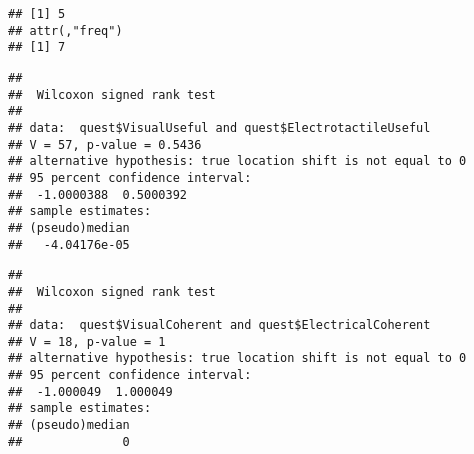\documentclass[
]{article}
\newenvironment{Shaded}{\begin{snugshade}}{\end{snugshade}}
\newcommand{\CommentTok}[1]{\textcolor[rgb]{0.56,0.35,0.01}{\textit{#1}}}
\newcommand{\DataTypeTok}[1]{\textcolor[rgb]{0.13,0.29,0.53}{#1}}
\newcommand{\KeywordTok}[1]{\textcolor[rgb]{0.13,0.29,0.53}{\textbf{#1}}}
\newcommand{\NormalTok}[1]{#1}
\newcommand{\OperatorTok}[1]{\textcolor[rgb]{0.81,0.36,0.00}{\textbf{#1}}}
\newcommand{\OtherTok}[1]{\textcolor[rgb]{0.56,0.35,0.01}{#1}}
\newcommand{\StringTok}[1]{\textcolor[rgb]{0.31,0.60,0.02}{#1}}
\begin{document}
\begin{verbatim}
## [1] 5
## attr(,"freq")
## [1] 7
\end{verbatim}

\begin{Shaded}
\end{Shaded}

\begin{verbatim}
## 
##  Wilcoxon signed rank test
## 
## data:  quest$VisualUseful and quest$ElectrotactileUseful
## V = 57, p-value = 0.5436
## alternative hypothesis: true location shift is not equal to 0
## 95 percent confidence interval:
##  -1.0000388  0.5000392
## sample estimates:
## (pseudo)median 
##   -4.04176e-05
\end{verbatim}

\begin{Shaded}
\end{Shaded}

\begin{verbatim}
## 
##  Wilcoxon signed rank test
## 
## data:  quest$VisualCoherent and quest$ElectricalCoherent
## V = 18, p-value = 1
## alternative hypothesis: true location shift is not equal to 0
## 95 percent confidence interval:
##  -1.000049  1.000049
## sample estimates:
## (pseudo)median 
##              0
\end{verbatim}
\end{document}

